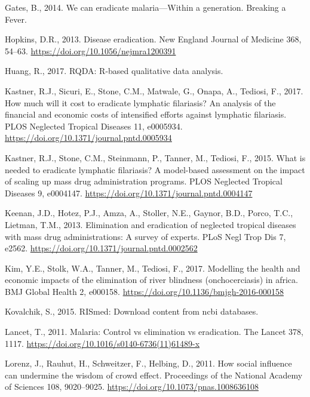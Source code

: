 \documentclass[]{article}
\begin{document}
\hypertarget{ref-Gates2014}{}
Gates, B., 2014. We can eradicate malaria---Within a generation.
Breaking a Fever.

\hypertarget{ref-Hopkins2013}{}
Hopkins, D.R., 2013. Disease eradication. New England Journal of
Medicine 368, 54--63. \url{https://doi.org/10.1056/nejmra1200391}

\hypertarget{ref-Ronggui2017}{}
Huang, R., 2017. RQDA: R-based qualitative data analysis.

\hypertarget{ref-Kastner2017}{}
Kastner, R.J., Sicuri, E., Stone, C.M., Matwale, G., Onapa, A., Tediosi,
F., 2017. How much will it cost to eradicate lymphatic filariasis? An
analysis of the financial and economic costs of intensified efforts
against lymphatic filariasis. PLOS Neglected Tropical Diseases 11,
e0005934. \url{https://doi.org/10.1371/journal.pntd.0005934}

\hypertarget{ref-Kastner2015}{}
Kastner, R.J., Stone, C.M., Steinmann, P., Tanner, M., Tediosi, F.,
2015. What is needed to eradicate lymphatic filariasis? A model-based
assessment on the impact of scaling up mass drug administration
programs. PLOS Neglected Tropical Diseases 9, e0004147.
\url{https://doi.org/10.1371/journal.pntd.0004147}

\hypertarget{ref-Keenan2013}{}
Keenan, J.D., Hotez, P.J., Amza, A., Stoller, N.E., Gaynor, B.D., Porco,
T.C., Lietman, T.M., 2013. Elimination and eradication of neglected
tropical diseases with mass drug administrations: A survey of experts.
PLoS Negl Trop Dis 7, e2562.
\url{https://doi.org/10.1371/journal.pntd.0002562}

\hypertarget{ref-Kim2017}{}
Kim, Y.E., Stolk, W.A., Tanner, M., Tediosi, F., 2017. Modelling the
health and economic impacts of the elimination of river blindness
(onchocerciasis) in africa. BMJ Global Health 2, e000158.
\url{https://doi.org/10.1136/bmjgh-2016-000158}

\hypertarget{ref-Kovalchik2015}{}
Kovalchik, S., 2015. RISmed: Download content from ncbi databases.

\hypertarget{ref-TheLancet2011}{}
Lancet, T., 2011. Malaria: Control vs elimination vs eradication. The
Lancet 378, 1117. \url{https://doi.org/10.1016/s0140-6736(11)61489-x}

\hypertarget{ref-Lorenz_2011}{}
Lorenz, J., Rauhut, H., Schweitzer, F., Helbing, D., 2011. How social
influence can undermine the wisdom of crowd effect. Proceedings of the
National Academy of Sciences 108, 9020--9025.
\url{https://doi.org/10.1073/pnas.1008636108}
\end{document}
